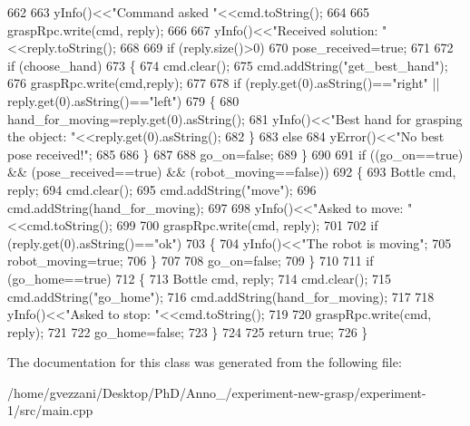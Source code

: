 \begin{DoxyCode}
662 
663             yInfo()<<\textcolor{stringliteral}{"Command asked "}<<cmd.toString();
664 
665             graspRpc.write(cmd, reply);
666 
667             yInfo()<<\textcolor{stringliteral}{"Received solution: "}<<reply.toString();
668 
669             \textcolor{keywordflow}{if} (reply.size()>0)
670                 pose\_received=\textcolor{keyword}{true};
671 
672             \textcolor{keywordflow}{if} (choose\_hand)
673             \{
674                 cmd.clear();
675                 cmd.addString(\textcolor{stringliteral}{"get\_best\_hand"});
676                 graspRpc.write(cmd,reply);
677 
678                 \textcolor{keywordflow}{if} (reply.get(0).asString()==\textcolor{stringliteral}{"right"} || reply.get(0).asString()==\textcolor{stringliteral}{"left"})
679                 \{
680                     hand\_for\_moving=reply.get(0).asString();
681                     yInfo()<<\textcolor{stringliteral}{"Best hand for grasping the object: "}<<reply.get(0).asString();
682                 \}
683                 \textcolor{keywordflow}{else}
684                     yError()<<\textcolor{stringliteral}{"No best pose received!"};
685 
686             \}
687 
688             go\_on=\textcolor{keyword}{false};
689         \}
690 
691         \textcolor{keywordflow}{if} ((go\_on==\textcolor{keyword}{true}) && (pose\_received==\textcolor{keyword}{true}) && (robot\_moving==\textcolor{keyword}{false}))
692         \{
693             Bottle cmd, reply;
694             cmd.clear();
695             cmd.addString(\textcolor{stringliteral}{"move"});
696             cmd.addString(hand\_for\_moving);
697 
698             yInfo()<<\textcolor{stringliteral}{"Asked to move: "}<<cmd.toString();
699 
700             graspRpc.write(cmd, reply);
701 
702             \textcolor{keywordflow}{if} (reply.get(0).asString()==\textcolor{stringliteral}{"ok"})
703             \{
704                 yInfo()<<\textcolor{stringliteral}{"The robot is moving"};
705                 robot\_moving=\textcolor{keyword}{true};
706             \}
707 
708             go\_on=\textcolor{keyword}{false};
709         \}
710 
711         \textcolor{keywordflow}{if} (go\_home==\textcolor{keyword}{true})
712         \{
713             Bottle cmd, reply;
714             cmd.clear();
715             cmd.addString(\textcolor{stringliteral}{"go\_home"});
716             cmd.addString(hand\_for\_moving);
717 
718             yInfo()<<\textcolor{stringliteral}{"Asked to stop: "}<<cmd.toString();
719 
720             graspRpc.write(cmd, reply);
721 
722             go\_home=\textcolor{keyword}{false};
723         \}
724 
725         \textcolor{keywordflow}{return} \textcolor{keyword}{true};
726     \}
\end{DoxyCode}


The documentation for this class was generated from the following file\-:\begin{DoxyCompactItemize}
\item 
/home/gvezzani/\-Desktop/\-Ph\-D/\-Anno\-\_/experiment-\/new-\/grasp/experiment-\/1/src/main.\-cpp\end{DoxyCompactItemize}

